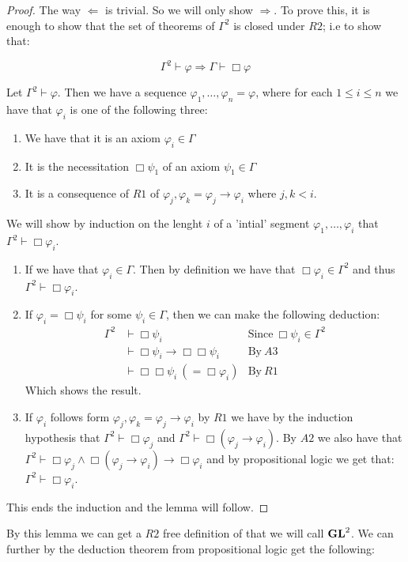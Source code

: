 \documentclass[../main.tex]{subfiles}
\begin{document}
\begin{proof}
	The way $\Leftarrow$ is trivial. So we will only show $\Rightarrow$.
	To prove this, it is enough to show that the set of theorems of
	$\Gamma^2$ is closed under $R2$; i.e to show that:

	$$\Gamma^2\vdash\varphi\Rightarrow\Gamma\vdash\Box\varphi$$

	Let $\Gamma^2\vdash\varphi$. Then we have a sequence
	$\varphi_1,\ldots,\varphi_n=\varphi$, where for each $1\leq i\leq n$ we
	have that $\varphi_i$ is one of the following three:
	\begin{enumerate}
		\item We have that it is an axiom $\varphi_i\in\Gamma$ 
		\item It is the necessitation  $\Box\psi_1$ of an axiom
			$\psi_1\in\Gamma$
		\item It is a consequence of $R1$ of
			$\varphi_j,\varphi_k=\varphi_j\rightarrow\varphi_i$
			where $j,k<i$.
	\end{enumerate}
	We will show  by induction on the lenght $i$ of a 'intial' segment
	$\varphi_1,\ldots,\varphi_i$ that $\Gamma^2\vdash \Box\varphi_i$. 
	\begin{enumerate}
		\item If we have that $\varphi_i\in\Gamma$. Then by definition
			we have that $\Box\varphi_i\in\Gamma^2$ and thus
			$\Gamma^2\vdash\Box\varphi_i$.
		\item If $\varphi_i=\Box\psi_i$ for some $\psi_i\in\Gamma$,
			then we can make the following deduction:
			\begin{align*}
				\Gamma^2&\vdash\Box\psi_i &\text{Since}\
				\Box\psi_i\in\Gamma^2\\
					&\vdash\Box\psi_i\rightarrow\Box\Box\psi_i
					&\text{By}\ A3\\
					&\vdash\Box\Box\psi_i\ (=\Box\varphi_i) 
					&\text{By}\ R1
			\end{align*}
			Which shows the result.
		\item If $\varphi_i$ follows form
			$\varphi_j,\varphi_k=\varphi_j\rightarrow\varphi_i$ by
			$R1$ we have by the induction hypothesis that
			$\Gamma^2\vdash\Box\varphi_j$ and
			$\Gamma^2\vdash\Box(\varphi_j\rightarrow\varphi_i)$. By
			$A2$ we also have that
			$\Gamma^2\vdash\Box\varphi_j\wedge\Box(\varphi_j\rightarrow\varphi_i)\rightarrow\Box\varphi_i$
			and by propositional logic we get that:
			$\Gamma^2\vdash\Box\varphi_i$.
	\end{enumerate}
	This ends the induction and the lemma will follow.
\end{proof}
By this lemma we can get a $R2$ free definition of \GL that we will call
$\text{\textbf{GL}}^2$. We can further by the deduction theorem from propositional logic get
the following:
\end{document}
